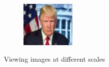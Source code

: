 \documentclass[a4paper,12pt]{article}
\begin{document}
\begin{figure}[h!]
\begin{subfigure}{0.3\textwidth}
			\caption{}
			\label{}
		\end{subfigure}
		\begin{subfigure}{0.1\textwidth}
			\centering
			\includegraphics[width=0.99\linewidth]{images/th_half_half}
			\caption{}
			\label{}
		\end{subfigure}
		\caption{Viewing images at different scales}
		\label{fig:scales}
	\end{figure}
\end{document}
